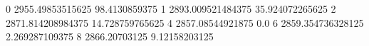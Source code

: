 0 2955.49853515625 98.4130859375
1 2893.009521484375 35.924072265625
2 2871.814208984375 14.728759765625
4 2857.08544921875 0.0
6 2859.354736328125 2.269287109375
8 2866.20703125 9.12158203125

